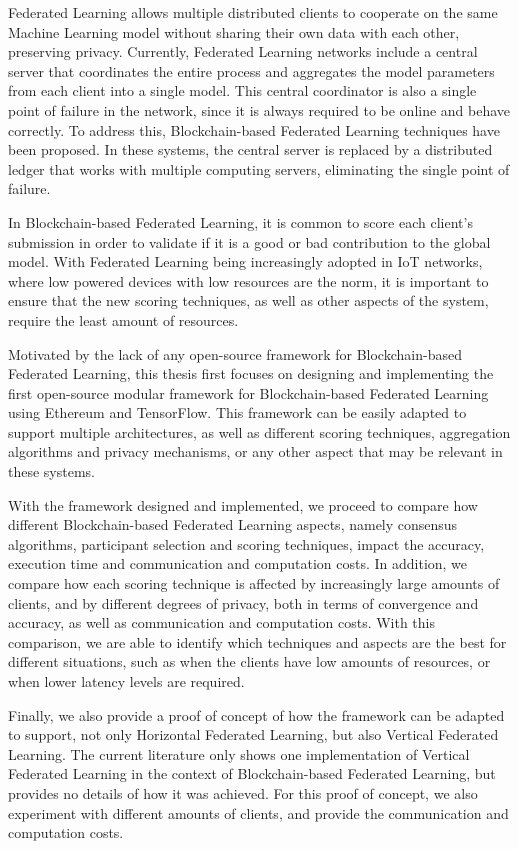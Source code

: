 Federated Learning allows multiple distributed clients to cooperate on the same Machine Learning model without sharing their own data with each other, preserving privacy. Currently, Federated Learning networks include a central server that coordinates the entire process and aggregates the model parameters from each client into a single model. This central coordinator is also a single point of failure in the network, since it is always required to be online and behave correctly. To address this, Blockchain-based Federated Learning techniques have been proposed. In these systems, the central server is replaced by a distributed ledger that works with multiple computing servers, eliminating the single point of failure.

In Blockchain-based Federated Learning, it is common to score each client's submission in order to validate if it is a good or bad contribution to the global model. With Federated Learning being increasingly adopted in IoT networks, where low powered devices with low resources are the norm, it is important to ensure that the new scoring techniques, as well as other aspects of the system, require the least amount of resources.

Motivated by the lack of any open-source framework for Blockchain-based Federated Learning, this thesis first focuses on designing and implementing the first open-source modular framework for Blockchain-based Federated Learning using Ethereum and TensorFlow. This framework can be easily adapted to support multiple architectures, as well as different scoring techniques, aggregation algorithms and privacy mechanisms, or any other aspect that may be relevant in these systems.

With the framework designed and implemented, we proceed to compare how different Blockchain-based Federated Learning aspects, namely consensus algorithms, participant selection and scoring techniques, impact the accuracy, execution time and communication and computation costs. In addition, we compare how each scoring technique is affected by increasingly large amounts of clients, and by different degrees of privacy, both in terms of convergence and accuracy, as well as communication and computation costs. With this comparison, we are able to identify which techniques and aspects are the best for different situations, such as when the clients have low amounts of resources, or when lower latency levels are required.

Finally, we also provide a proof of concept of how the framework can be adapted to support, not only Horizontal Federated Learning, but also Vertical Federated Learning. The current literature only shows one implementation of Vertical Federated Learning in the context of Blockchain-based Federated Learning, but provides no details of how it was achieved. For this proof of concept, we also experiment with different amounts of clients, and provide the communication and computation costs.
